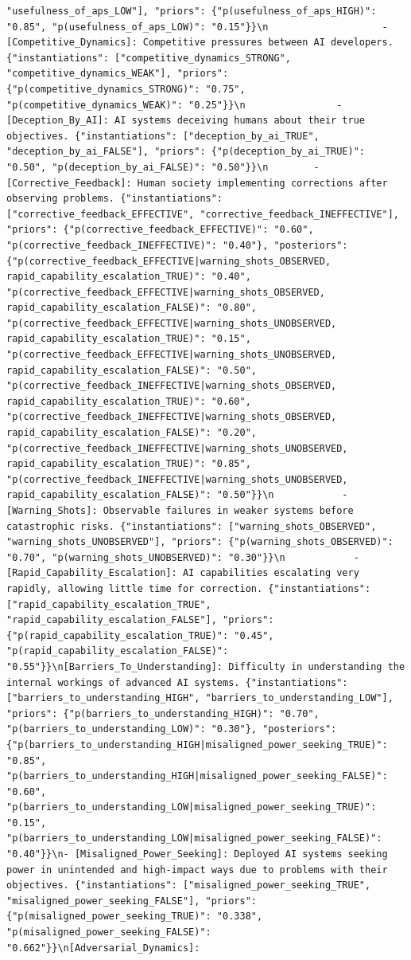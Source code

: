 \documentclass[
  11pt,
  letterpaper,
]{book}
\begin{document}
\begin{verbatim}
"usefulness_of_aps_LOW"], "priors": {"p(usefulness_of_aps_HIGH)": "0.85", "p(usefulness_of_aps_LOW)": "0.15"}}\n                    - [Competitive_Dynamics]: Competitive pressures between AI developers. {"instantiations": ["competitive_dynamics_STRONG", "competitive_dynamics_WEAK"], "priors": {"p(competitive_dynamics_STRONG)": "0.75", "p(competitive_dynamics_WEAK)": "0.25"}}\n                - [Deception_By_AI]: AI systems deceiving humans about their true objectives. {"instantiations": ["deception_by_ai_TRUE", "deception_by_ai_FALSE"], "priors": {"p(deception_by_ai_TRUE)": "0.50", "p(deception_by_ai_FALSE)": "0.50"}}\n        - [Corrective_Feedback]: Human society implementing corrections after observing problems. {"instantiations": ["corrective_feedback_EFFECTIVE", "corrective_feedback_INEFFECTIVE"], "priors": {"p(corrective_feedback_EFFECTIVE)": "0.60", "p(corrective_feedback_INEFFECTIVE)": "0.40"}, "posteriors": {"p(corrective_feedback_EFFECTIVE|warning_shots_OBSERVED, rapid_capability_escalation_TRUE)": "0.40", "p(corrective_feedback_EFFECTIVE|warning_shots_OBSERVED, rapid_capability_escalation_FALSE)": "0.80", "p(corrective_feedback_EFFECTIVE|warning_shots_UNOBSERVED, rapid_capability_escalation_TRUE)": "0.15", "p(corrective_feedback_EFFECTIVE|warning_shots_UNOBSERVED, rapid_capability_escalation_FALSE)": "0.50", "p(corrective_feedback_INEFFECTIVE|warning_shots_OBSERVED, rapid_capability_escalation_TRUE)": "0.60", "p(corrective_feedback_INEFFECTIVE|warning_shots_OBSERVED, rapid_capability_escalation_FALSE)": "0.20", "p(corrective_feedback_INEFFECTIVE|warning_shots_UNOBSERVED, rapid_capability_escalation_TRUE)": "0.85", "p(corrective_feedback_INEFFECTIVE|warning_shots_UNOBSERVED, rapid_capability_escalation_FALSE)": "0.50"}}\n            - [Warning_Shots]: Observable failures in weaker systems before catastrophic risks. {"instantiations": ["warning_shots_OBSERVED", "warning_shots_UNOBSERVED"], "priors": {"p(warning_shots_OBSERVED)": "0.70", "p(warning_shots_UNOBSERVED)": "0.30"}}\n            - [Rapid_Capability_Escalation]: AI capabilities escalating very rapidly, allowing little time for correction. {"instantiations": ["rapid_capability_escalation_TRUE", "rapid_capability_escalation_FALSE"], "priors": {"p(rapid_capability_escalation_TRUE)": "0.45", "p(rapid_capability_escalation_FALSE)": "0.55"}}\n[Barriers_To_Understanding]: Difficulty in understanding the internal workings of advanced AI systems. {"instantiations": ["barriers_to_understanding_HIGH", "barriers_to_understanding_LOW"], "priors": {"p(barriers_to_understanding_HIGH)": "0.70", "p(barriers_to_understanding_LOW)": "0.30"}, "posteriors": {"p(barriers_to_understanding_HIGH|misaligned_power_seeking_TRUE)": "0.85", "p(barriers_to_understanding_HIGH|misaligned_power_seeking_FALSE)": "0.60", "p(barriers_to_understanding_LOW|misaligned_power_seeking_TRUE)": "0.15", "p(barriers_to_understanding_LOW|misaligned_power_seeking_FALSE)": "0.40"}}\n- [Misaligned_Power_Seeking]: Deployed AI systems seeking power in unintended and high-impact ways due to problems with their objectives. {"instantiations": ["misaligned_power_seeking_TRUE", "misaligned_power_seeking_FALSE"], "priors": {"p(misaligned_power_seeking_TRUE)": "0.338", "p(misaligned_power_seeking_FALSE)": "0.662"}}\n[Adversarial_Dynamics]: 
\end{verbatim}
\end{document}
